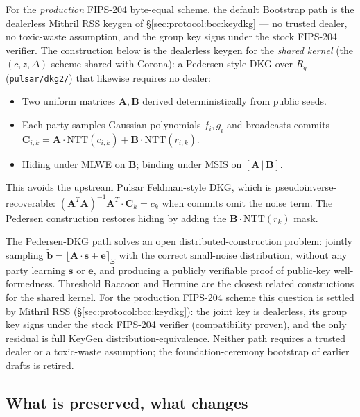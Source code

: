 For the \emph{production} FIPS-204 byte-equal scheme, the default Bootstrap
path is the dealerless Mithril RSS keygen of
\S\ref{sec:protocol:bcc:keydkg} --- no trusted dealer, no toxic-waste
assumption, and the group key signs under the stock FIPS-204 verifier. The
construction below is the dealerless keygen for the \emph{shared kernel}
(the $(c,z,\Delta)$ scheme shared with Corona): a Pedersen-style DKG over
$R_q$ (\texttt{pulsar/dkg2/}) that likewise requires no dealer:

\begin{itemize}[leftmargin=2em,nosep]
  \item Two uniform matrices $\mathbf{A}, \mathbf{B}$ derived
        deterministically from public seeds.
  \item Each party samples Gaussian polynomials $f_i, g_i$ and
        broadcasts commits $\mathbf{C}_{i,k} = \mathbf{A}\cdot
        \mathrm{NTT}(c_{i,k}) + \mathbf{B}\cdot\mathrm{NTT}(r_{i,k})$.
  \item Hiding under MLWE on $\mathbf{B}$; binding under MSIS on
        $[\mathbf{A}\,|\,\mathbf{B}]$.
\end{itemize}

This avoids the upstream Pulsar Feldman-style DKG, which is
pseudoinverse-recoverable: $(\mathbf{A}^T\mathbf{A})^{-1}\mathbf{A}^T
\cdot \mathbf{C}_k = c_k$ when commits omit the noise term. The
Pedersen construction restores hiding by adding the
$\mathbf{B}\cdot\mathrm{NTT}(r_k)$ mask.

The Pedersen-DKG path solves an open distributed-construction problem:
jointly sampling $\tilde{\mathbf{b}} = \lfloor \mathbf{A}\cdot
\mathbf{s} + \mathbf{e} \rceil_\Xi$ with the correct small-noise
distribution, without any party learning $\mathbf{s}$ or $\mathbf{e}$,
and producing a publicly verifiable proof of public-key
well-formedness. Threshold Raccoon \cite{thresholdraccoon} and Hermine
\cite{hermine} are the closest related constructions for the shared
kernel. For the production FIPS-204 scheme this question is settled by
Mithril RSS \cite{mithril2026} (\S\ref{sec:protocol:bcc:keydkg}): the
joint key is dealerless, its group key signs under the stock FIPS-204
verifier (compatibility proven), and the only residual is full KeyGen
distribution-equivalence. Neither path requires a trusted dealer or a
toxic-waste assumption; the foundation-ceremony bootstrap of earlier
drafts is retired.

\subsection{What is preserved, what changes}

